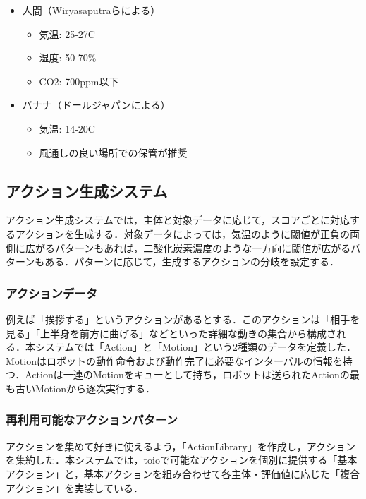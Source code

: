 \documentclass[paper=a4paper,jafontsize=9pt,head_space=15mm,gutter=20mm,
twocolumn,number_of_lines=49, line_length=26zw]{myuarticle}
\begin{document}
\begin{itemize}
  \item
    人間（Wiryasaputraら\cite{Wiryasaputra-2023-ReviewIntelligentIndoorEnvironment}による）
    \begin{itemize}
      \item 気温: 25-27\textdegree C
      \item 湿度: 50-70\%
      \item CO2: 700ppm以下
    \end{itemize}

  \item バナナ（ドールジャパン\cite{--バナナの}による）
    \begin{itemize}
      \item 気温: 14-20\textdegree C
      \item 風通しの良い場所での保管が推奨
    \end{itemize}
\end{itemize}

\subsection{アクション生成システム}
アクション生成システムでは，主体と対象データに応じて，スコアごとに対応するアクションを生成する．対象データによっては，気温のように閾値が正負の両側に広がるパターンもあれば，二酸化炭素濃度のような一方向に閾値が広がるパターンもある．パターンに応じて，生成するアクションの分岐を設定する．

\subsubsection{アクションデータ}
例えば「挨拶する」というアクションがあるとする．このアクションは「相手を見る」「上半身を前方に曲げる」などといった詳細な動きの集合から構成される．本システムでは「Action」と「Motion」という2種類のデータを定義した．Motionはロボットの動作命令および動作完了に必要なインターバルの情報を持つ．Actionは一連のMotionをキューとして持ち，ロボットは送られたActionの最も古いMotionから逐次実行する．

\subsubsection{再利用可能なアクションパターン}
アクションを集めて好きに使えるよう，「ActionLibrary」を作成し，アクションを集約した．本システムでは，toioで可能なアクションを個別に提供する「基本アクション」と，基本アクションを組み合わせて各主体・評価値に応じた「複合アクション」を実装している．
\end{document}
